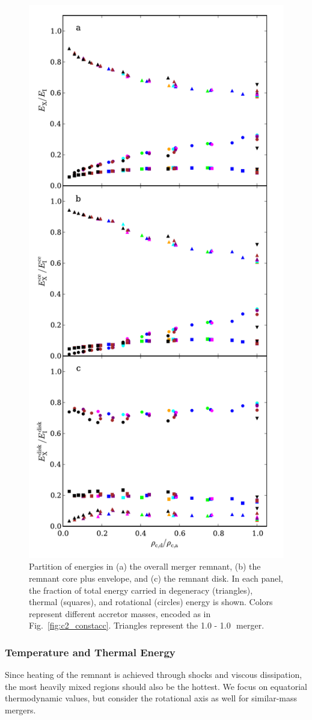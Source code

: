 \begin{figure}
\centering
\includegraphics[width=0.6\columnwidth]{chapter2_zhu+13/figures/EnergyTrendsq.pdf}
\caption{Partition of energies in (a) the overall merger remnant, (b) the remnant core plus envelope, and (c) the remnant disk.  In each panel, the fraction of total energy carried in degeneracy (triangles), thermal (squares), and rotational (circles) energy is shown.  Colors represent different accretor masses, encoded as in Fig.~\ref{fig:c2_constacc}.  Triangles represent the 1.0 - 1.0\,\Msun\ merger.}
\label{fig:c2_energytrends}
\end{figure}

\subsubsection{Temperature and Thermal Energy}
\label{sssec:c2_thermtrends}

Since heating of the remnant is achieved through shocks and viscous dissipation, the most heavily mixed regions should also be the hottest.  We focus on equatorial thermodynamic values, but consider the rotational axis as well for similar-mass mergers.

